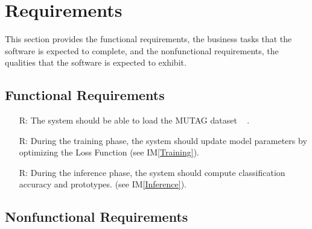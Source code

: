 \documentclass[12pt]{article}
\newcommand{\iref}[1]{IM\ref{#1}}
\newcounter{reqnum} %
\begin{document}
\section{Requirements}

This section provides the functional requirements, the business tasks that the
software is expected to complete, and the nonfunctional requirements, the
qualities that the software is expected to exhibit.

\subsection{Functional Requirements}

\noindent \begin{itemize}

\item[R\refstepcounter{reqnum}\thereqnum \label{R_Inputs}:] The system should be able to load the MUTAG dataset ~\cite{debnath1991structure} .

\item[R\refstepcounter{reqnum}\thereqnum \label{R_Train}:] During the training phase, the system should update model parameters by optimizing the Loss Function (see \iref{Training}).

\item[R\refstepcounter{reqnum}\thereqnum \label{R_VerifyOutput}:] During the inference phase, the system should compute classification accuracy and prototypes. (see \iref{Inference}).


\end{itemize}


\subsection{Nonfunctional Requirements}
\end{document}
